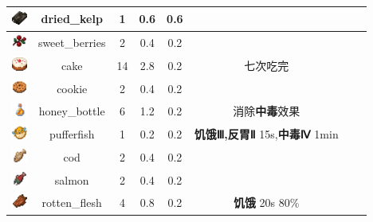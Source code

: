 \begin{center}
\begin{longtable}{c|c|ccc|ccc}
        \includegraphics[width=0.5cm,height=0.5cm]{./images/origin/dried_kelp.png}  & dried\_kelp & 1 & 0.6 & 0.6 \\ 
        \midrule
        \includegraphics[width=0.5cm,height=0.5cm]{./images/origin/sweet_berries.png} & sweet\_berries & 2 & 0.4 & 0.2 &  \\ 
        \includegraphics[width=0.5cm,height=0.5cm]{./images/origin/cake.png} & cake & 14 & 2.8 & 0.2 & 七次吃完 \\
        \includegraphics[width=0.5cm,height=0.5cm]{./images/origin/cookie.png}  & cookie & 2 & 0.4 & 0.2 \\ 
        \includegraphics[width=0.5cm,height=0.5cm]{./images/origin/honey_bottle.png}  & honey\_bottle & 6 & 1.2 & 0.2 & 消除\textbf{中毒}效果 \\ 
        \includegraphics[width=0.5cm,height=0.5cm]{./images/origin/pufferfish.png}  & pufferfish & 1 & 0.2 & 0.2 & \textbf{饥饿Ⅲ,反胃Ⅱ} 15s,\textbf{中毒Ⅳ} 1min\\ 
        \includegraphics[width=0.5cm,height=0.5cm]{./images/origin/cod.png}  & cod & 2 & 0.4 & 0.2 \\ 
        \includegraphics[width=0.5cm,height=0.5cm]{./images/origin/salmon.png}  & salmon & 2 & 0.4 & 0.2 \\ 
        \includegraphics[width=0.5cm,height=0.5cm]{./images/origin/rotten_flesh.png}  & rotten\_flesh & 4 & 0.8 & 0.2 & \textbf{饥饿} 20s 80\% \\ 

\end{longtable}
\end{center}
